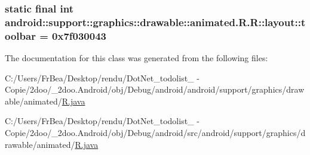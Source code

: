 \hypertarget{classandroid_1_1support_1_1graphics_1_1drawable_1_1animated_1_1_r_1_1layout_e9076199956a77a9d1b510b6a594b144}{
\subsubsection[{toolbar}]{\setlength{\rightskip}{0pt plus 5cm}static final int android::support::graphics::drawable::animated.R.R::layout::toolbar = 0x7f030043}}
\label{classandroid_1_1support_1_1graphics_1_1drawable_1_1animated_1_1_r_1_1layout_e9076199956a77a9d1b510b6a594b144}




The documentation for this class was generated from the following files:\begin{CompactItemize}
\item 
C:/Users/FrBea/Desktop/rendu/DotNet\_\-todolist\_ - Copie/2doo/\_\-2doo.Android/obj/Debug/android/android/support/graphics/drawable/animated/\hyperlink{android_2support_2graphics_2drawable_2animated_2_r_8java}{R.java}\item 
C:/Users/FrBea/Desktop/rendu/DotNet\_\-todolist\_ - Copie/2doo/\_\-2doo.Android/obj/Debug/android/src/android/support/graphics/drawable/animated/\hyperlink{src_2android_2support_2graphics_2drawable_2animated_2_r_8java}{R.java}\end{CompactItemize}

